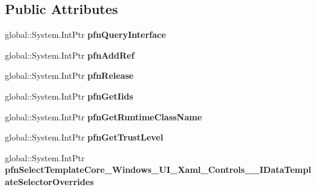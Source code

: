 \subsection*{Public Attributes}
\begin{DoxyCompactItemize}
\item 
\mbox{\label{struct_windows_1_1_u_i_1_1_xaml_1_1_controls_1_1_i_data_template_selector_overrides_____impl_1_1_vtbl_ae967459a5d45bf3420ab3e8321b333d7}} 
global\+::\+System.\+Int\+Ptr {\bfseries pfn\+Query\+Interface}
\item 
\mbox{\label{struct_windows_1_1_u_i_1_1_xaml_1_1_controls_1_1_i_data_template_selector_overrides_____impl_1_1_vtbl_a6ec50eb78ecaf3fef64041297ce6631b}} 
global\+::\+System.\+Int\+Ptr {\bfseries pfn\+Add\+Ref}
\item 
\mbox{\label{struct_windows_1_1_u_i_1_1_xaml_1_1_controls_1_1_i_data_template_selector_overrides_____impl_1_1_vtbl_ad8d9657f4bcd24773da30365dc5c05fa}} 
global\+::\+System.\+Int\+Ptr {\bfseries pfn\+Release}
\item 
\mbox{\label{struct_windows_1_1_u_i_1_1_xaml_1_1_controls_1_1_i_data_template_selector_overrides_____impl_1_1_vtbl_a0afb8f9830c66bdc4b00ae91921caa76}} 
global\+::\+System.\+Int\+Ptr {\bfseries pfn\+Get\+Iids}
\item 
\mbox{\label{struct_windows_1_1_u_i_1_1_xaml_1_1_controls_1_1_i_data_template_selector_overrides_____impl_1_1_vtbl_ae0ce535ab4524d6e52b0e7562d214a01}} 
global\+::\+System.\+Int\+Ptr {\bfseries pfn\+Get\+Runtime\+Class\+Name}
\item 
\mbox{\label{struct_windows_1_1_u_i_1_1_xaml_1_1_controls_1_1_i_data_template_selector_overrides_____impl_1_1_vtbl_a9ef3aaf3aedf6c6da59c089f624d8bec}} 
global\+::\+System.\+Int\+Ptr {\bfseries pfn\+Get\+Trust\+Level}
\item 
\mbox{\label{struct_windows_1_1_u_i_1_1_xaml_1_1_controls_1_1_i_data_template_selector_overrides_____impl_1_1_vtbl_a21b9b268d431a58850731f8e79dc42f8}} 
global\+::\+System.\+Int\+Ptr {\bfseries pfn\+Select\+Template\+Core\+\_\+\+Windows\+\_\+\+U\+I\+\_\+\+Xaml\+\_\+\+Controls\+\_\+\+\_\+\+I\+Data\+Template\+Selector\+Overrides}
\end{DoxyCompactItemize}
